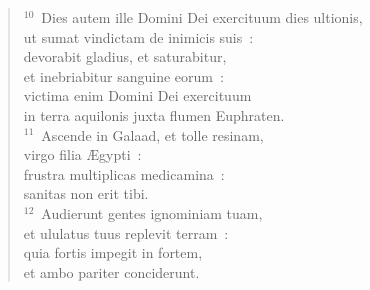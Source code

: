 \begin{flushleft}
\begin{verse}
${}^{10}$~Dies autem ille Domini Dei exercituum dies ultionis,\\ ut sumat vindictam de inimicis suis~:\\ devorabit gladius, et saturabitur,\\ et inebriabitur sanguine eorum~:\\ victima enim Domini Dei exercituum\\ in terra aquilonis juxta flumen Euphraten.\\
${}^{11}$~Ascende in Galaad, et tolle resinam,\\ virgo filia \AE gypti~:\\ frustra multiplicas medicamina~:\\ sanitas non erit tibi.\\
${}^{12}$~Audierunt gentes ignominiam tuam,\\ et ululatus tuus replevit terram~:\\ quia fortis impegit in fortem,\\ et ambo pariter conciderunt.\end{verse}\end{flushleft}


